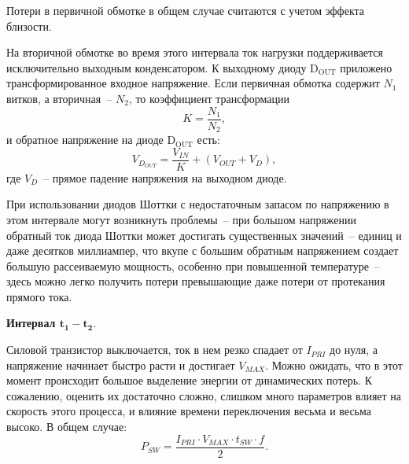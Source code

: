 Потери в первичной обмотке в общем случае считаются с учетом эффекта близости.

На вторичной обмотке во время этого интервала ток нагрузки поддерживается
исключительно выходным конденсатором. К выходному диоду \( \mathrm{D_{OUT}} \)
приложено трансформированное входное напряжение. Если первичная обмотка содержит
\( N_1 \) витков, а вторичная~-- \( N_2 \), то коэффициент трансформации
\begin{equation}
	K = \frac{N_1}{N_2},
\end{equation}
и обратное напряжение на диоде \( \mathrm{D_{OUT}} \) есть:
\begin{equation}
	V_{D_{OUT}} = \frac{V_{IN}}{K} + (V_{OUT} + V_D),
\end{equation}
где \( V_D \)~-- прямое падение напряжения на выходном диоде.

При использовании диодов Шоттки с недостаточным запасом по напряжению в этом
интервале могут возникнуть проблемы~-- при большом напряжении обратный ток диода
Шоттки может достигать существенных значений~-- единиц и даже десятков
миллиампер, что вкупе с большим обратным напряжением создает большую
рассеиваемую мощность, особенно при повышенной температуре~-- здесь можно легко
получить потери превышающие даже потери от протекания прямого тока.

\textbf{Интервал \( \bm{t_1 - t_2} \)}.

Силовой транзистор выключается, ток в нем резко спадает от \( I_{PRI} \) до
нуля, а напряжение начинает быстро расти и достигает \( V_{MAX} \). Можно
ожидать, что в этот момент происходит большое выделение энергии от динамических
потерь. К сожалению, оценить их достаточно сложно, слишком много параметров
влияет на скорость этого процесса, и влияние времени переключения весьма и
весьма высоко. В общем случае:
\begin{equation}
	P_{SW} = \frac{I_{PRI}\cdot V_{MAX}\cdot t_{SW}\cdot f}{2}.
\end{equation}
		
